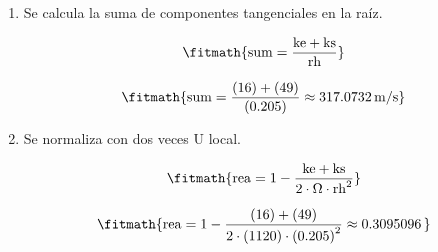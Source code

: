 \begin{enumerate}

\item Se calcula la suma de componentes tangenciales en la raíz.

\[\fitmath{\mathrm{sum}=\frac{\mathrm{ke}+\mathrm{ks}}{\mathrm{rh}}}\]

\[\fitmath{\mathrm{sum}=\frac{(16)+(49)}{(0.205)}\approx 317.0732\,\mathrm{m/s}}\]

\item Se normaliza con dos veces U local.

\[\fitmath{\mathrm{rea}=1-\frac{\mathrm{ke}+\mathrm{ks}}{2\cdot \Omega\cdot {\mathrm{rh}}^{2}}}\]

\[\fitmath{\mathrm{rea}=1-\frac{(16)+(49)}{2\cdot (1120)\cdot {(0.205)}^{2}}\approx 0.3095096\,}\]

\end{enumerate}
